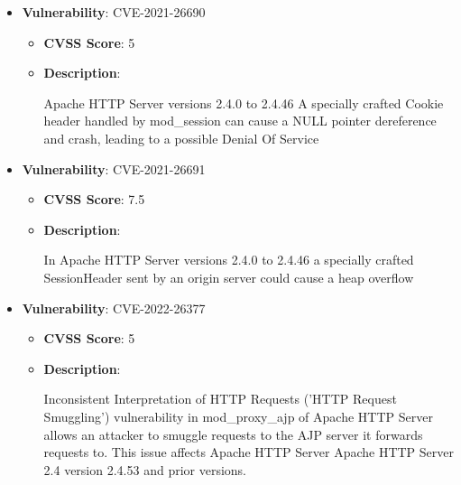 \documentclass{article}
\begin{document}
\begin{itemize}
        \item \textbf{Vulnerability}: CVE-2021-26690
        \begin{itemize}
            \item \textbf{CVSS Score}:  5 
            \item \textbf{Description}:
            \parbox[t]{0.9\linewidth}{
                \ttfamily Apache HTTP Server versions 2.4.0 to 2.4.46 A specially crafted Cookie header handled by mod\_session can cause a NULL pointer dereference and crash, leading to a possible Denial Of Service
            }
        \end{itemize}
    
        \item \textbf{Vulnerability}: CVE-2021-26691
        \begin{itemize}
            \item \textbf{CVSS Score}:  7.5 
            \item \textbf{Description}:
            \parbox[t]{0.9\linewidth}{
                \ttfamily In Apache HTTP Server versions 2.4.0 to 2.4.46 a specially crafted SessionHeader sent by an origin server could cause a heap overflow
            }
        \end{itemize}
    
        \item \textbf{Vulnerability}: CVE-2022-26377
        \begin{itemize}
            \item \textbf{CVSS Score}:  5 
            \item \textbf{Description}:
            \parbox[t]{0.9\linewidth}{
                \ttfamily Inconsistent Interpretation of HTTP Requests ('HTTP Request Smuggling') vulnerability in mod\_proxy\_ajp of Apache HTTP Server allows an attacker to smuggle requests to the AJP server it forwards requests to. This issue affects Apache HTTP Server Apache HTTP Server 2.4 version 2.4.53 and prior versions.
            }
        \end{itemize}
    

\end{itemize}
\end{document}
